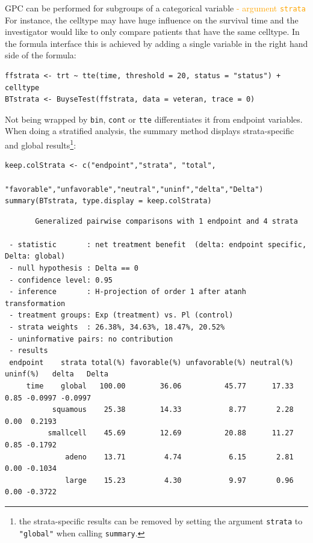 \documentclass[12pt]{article}
\begin{document}
GPC can be performed for subgroups of a categorical variable \hfill
\textcolor{orange}{- argument \texttt{strata}} \newline For
instance, the celltype may have huge influence on the survival time
and the investigator would like to only compare patients that have the
same celltype. In the formula interface this is achieved by adding a
single variable in the right hand side of the formula:
\lstset{language=r,label= ,caption= ,captionpos=b,numbers=none}
\begin{lstlisting}
ffstrata <- trt ~ tte(time, threshold = 20, status = "status") + celltype
BTstrata <- BuyseTest(ffstrata, data = veteran, trace = 0)
\end{lstlisting}

Not being wrapped by \texttt{bin}, \texttt{cont} or \texttt{tte} differentiates it from
endpoint variables. When doing a stratified analysis, the summary method
displays strata-specific and global results\footnote{the strata-specific
results can be removed by setting the argument \texttt{strata} to \texttt{"global"}
when calling \texttt{summary}.}:
\lstset{language=r,label= ,caption= ,captionpos=b,numbers=none}
\begin{lstlisting}
keep.colStrata <- c("endpoint","strata", "total",
                    "favorable","unfavorable","neutral","uninf","delta","Delta")
summary(BTstrata, type.display = keep.colStrata)
\end{lstlisting}

\begin{verbatim}
       Generalized pairwise comparisons with 1 endpoint and 4 strata

 - statistic       : net treatment benefit  (delta: endpoint specific, Delta: global) 
 - null hypothesis : Delta == 0 
 - confidence level: 0.95 
 - inference       : H-projection of order 1 after atanh transformation 
 - treatment groups: Exp (treatment) vs. Pl (control) 
 - strata weights  : 26.38%, 34.63%, 18.47%, 20.52% 
 - uninformative pairs: no contribution
 - results
 endpoint    strata total(%) favorable(%) unfavorable(%) neutral(%) uninf(%)   delta   Delta
     time    global   100.00        36.06          45.77      17.33     0.85 -0.0997 -0.0997
           squamous    25.38        14.33           8.77       2.28     0.00  0.2193        
          smallcell    45.69        12.69          20.88      11.27     0.85 -0.1792        
              adeno    13.71         4.74           6.15       2.81     0.00 -0.1034        
              large    15.23         4.30           9.97       0.96     0.00 -0.3722
\end{verbatim}
\end{document}
